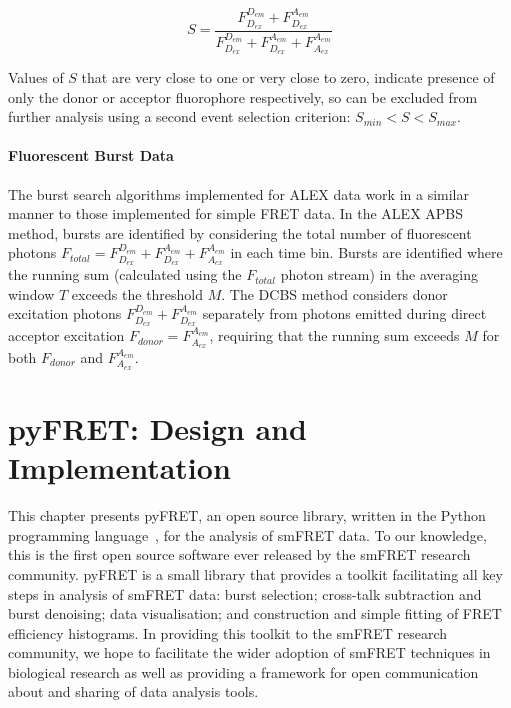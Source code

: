 \begin{equation}
S = \frac{F_{D_{ex}}^{D_{em}} + F_{D_{ex}}^{A_{em}}}{F_{D_{ex}}^{D_{em}} + F_{D_{ex}}^{A_{em}} + F_{A_{ex}}^{A_{em}}}
\label{eq:stoichiometry}
\end{equation}

Values of $S$  that are very close to one or very close to zero, indicate presence of only the donor or acceptor fluorophore respectively, so can be excluded from further analysis using a second event selection criterion: $S_{min} < S < S_{max}$. 

\paragraph{Fluorescent Burst Data}
The burst search algorithms implemented for ALEX data work in a similar manner to those implemented for simple FRET data. In the ALEX APBS method, bursts are identified by considering the total number of fluorescent photons $F_{total} = F_{D_{ex}}^{D_{em}} + F_{D_{ex}}^{A_{em}} + F_{A_{ex}}^{A_{em}}$ in each time bin. Bursts are identified where the running sum (calculated using the  $F_{total}$ photon stream) in the averaging window $T$ exceeds the threshold $M$. The DCBS method considers donor excitation photons $F_{D_{ex}}^{D_{em}} + F_{D_{ex}}^{A_{em}}$ separately from photons emitted during direct acceptor excitation $F_{donor} = F_{A_{ex}}^{A_{em}}$, requiring that the running sum exceeds $M$ for both $F_{donor}$ and $F_{A_{ex}}^{A_{em}}$.

\section{pyFRET: Design and Implementation}
This chapter presents pyFRET, an open source library, written in the Python programming language~\cite{vanRossum1995}, for the analysis of smFRET data. To our knowledge, this is the first open source software ever released by the smFRET research community. pyFRET is a small library that provides a toolkit facilitating all key steps in analysis of smFRET data: burst selection; cross-talk subtraction and burst denoising; data visualisation; and construction and simple fitting of FRET efficiency histograms. In providing this toolkit to the smFRET research community, we hope to facilitate the wider adoption of smFRET techniques in biological research as well as providing a framework for open communication about and sharing of data analysis tools.

